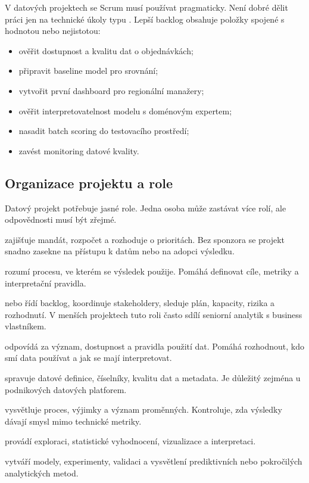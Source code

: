 V datových projektech se Scrum musí používat pragmaticky. Není dobré dělit práci jen na technické úkoly typu . Lepší backlog obsahuje položky spojené s hodnotou nebo nejistotou:
\begin{itemize}
  \item ověřit dostupnost a kvalitu dat o objednávkách;
  \item připravit baseline model pro srovnání;
  \item vytvořit první dashboard pro regionální manažery;
  \item ověřit interpretovatelnost modelu s doménovým expertem;
  \item nasadit batch scoring do testovacího prostředí;
  \item zavést monitoring datové kvality.
\end{itemize}

\subsection{Organizace projektu a role}
Datový projekt potřebuje jasné role. Jedna osoba může zastávat více rolí, ale odpovědnosti musí být zřejmé.

 zajišťuje mandát, rozpočet a rozhoduje o prioritách. Bez sponzora se projekt snadno zasekne na přístupu k datům nebo na adopci výsledku.

 rozumí procesu, ve kterém se výsledek použije. Pomáhá definovat cíle, metriky a interpretační pravidla.

 nebo  řídí backlog, koordinuje stakeholdery, sleduje plán, kapacity, rizika a rozhodnutí. V menších projektech tuto roli často sdílí seniorní analytik s business vlastníkem.

 odpovídá za význam, dostupnost a pravidla použití dat. Pomáhá rozhodnout, kdo smí data používat a jak se mají interpretovat.

 spravuje datové definice, číselníky, kvalitu dat a metadata. Je důležitý zejména u podnikových datových platforem.

 vysvětluje proces, výjimky a význam proměnných. Kontroluje, zda výsledky dávají smysl mimo technické metriky.

 provádí exploraci, statistické vyhodnocení, vizualizace a interpretaci.

 vytváří modely, experimenty, validaci a vysvětlení prediktivních nebo pokročilých analytických metod.

